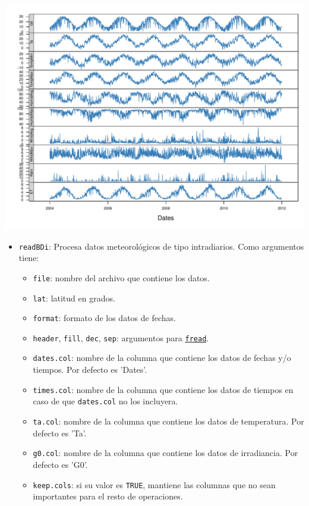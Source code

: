 \begin{itemize}
\begin{center}
\includegraphics[width=\textwidth]{figuras/codigo-readBD.pdf}
\end{center}
\begin{itemize}
\item \texttt{readBDi}: Procesa datos meteorológicos de tipo intradiarios.
Como argumentos tiene:
\begin{itemize}
\item \texttt{file}: nombre del archivo que contiene los datos.
\item \texttt{lat}: latitud en grados.
\item \texttt{format}: formato de los datos de fechas.
\item \texttt{header}, \texttt{fill}, \texttt{dec}, \texttt{sep}: argumentos para \href{https://search.r-project.org/CRAN/refmans/data.table/html/fread.html}{\texttt{fread}}.
\item \texttt{dates.col}: nombre de la columna que contiene los datos de fechas y/o tiempos. Por defecto es 'Dates'.
\item \texttt{times.col}: nombre de la columna que contiene los datos de tiempos en caso de que \texttt{dates.col} no los incluyera.
\item \texttt{ta.col}: nombre de la columna que contiene los datos de temperatura. Por defecto es 'Ta'.
\item \texttt{g0.col}: nombre de la columna que contiene los datos de irradiancia. Por defecto es 'G0'.
\item \texttt{keep.cols}: si su valor es \texttt{TRUE}, mantiene las columnas que no sean importantes para el resto de operaciones.

\end{itemize}
\end{itemize}
\end{itemize}
